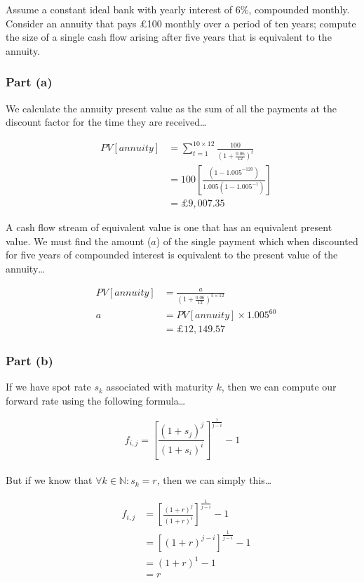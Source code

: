 \documentclass[11pt]{article}
\begin{document}
Assume a constant ideal bank with yearly interest of 6\%, compounded monthly. Consider an
annuity that pays £100 monthly over a period of ten years; compute the size of a single cash
flow arising after five years that is equivalent to the annuity.

\subsubsection*{Part (a)}

We calculate the annuity present value as the sum of all the payments at the discount factor
for the time they are received\dots

\setcounter{equation}{0}
\begin{eqnarray}
  & PV[annuity] &= \sum_{t=1}^{10 \times 12} \frac{100}{\left(1 + \frac{0.06}{12}\right)^{t}} \\[4mm]
  &&= 100 \left[ \frac{\left(1 - 1.005^{-120}\right)}{1.005\left(1 - 1.005^{-1}\right)} \right] \\[4mm]
  &&= £9,007.35
\end{eqnarray}

A cash flow stream of equivalent value is one that has an equivalent present value. We must find
the amount ($a$) of the single payment which when discounted for five years of compounded interest
is equivalent to the present value of the annuity\dots

\begin{eqnarray}
  & PV[annuity] &= \frac{a}{\left(1 + \frac{0.06}{12}\right)^{5 \times 12}} \\[4mm]
  & a &= PV[annuity] \times 1.005^{60} \\[4mm]
      &&= £12,149.57
\end{eqnarray}

\subsubsection*{Part (b)}

If we have spot rate $s_{k}$ associated with maturity $k$, then we can compute our forward
rate using the following formula\dots

\[ f_{i,j} = \left[ \frac{\left(1 + s_{j}\right)^{j}}{\left(1 + s_{i}\right)^{i}} \right]^{\frac{1}{j-i}} -1 \]
\\
But if we know that $\forall k\in\mathbb{N}:s_{k} = r$, then we can simply this\dots

\setcounter{equation}{0}
\begin{eqnarray}
  & f_{i,j} &= \left[ \frac{\left(1+r\right)^{j}}{\left(1+r\right)^{i}} \right]^{\frac{1}{j-i}} -1 \\[3mm]
  &&= \left[ \left(1+r\right)^{j-i} \right]^{\frac{1}{j-i}} -1 \\[3mm]
  &&= \left(1+r\right)^{1} -1 \\[3mm]
  &&= r
\end{eqnarray}
\end{document}
